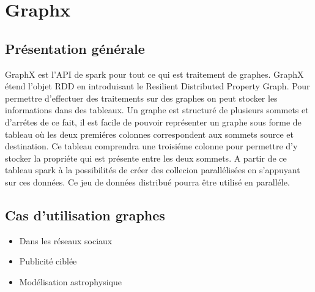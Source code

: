 \section{Graphx}

\subsection{Présentation générale}

GraphX est l'API de spark pour tout ce qui est traitement de graphes. GraphX étend l'objet RDD en introduisant le Resilient Distributed Property Graph. Pour permettre d'effectuer des traitements sur des graphes on peut stocker les informations dans des tableaux. Un graphe est structuré de plusieurs sommets et d'arrétes de ce fait, il est facile de pouvoir représenter un graphe sous forme de tableau où les deux premiéres colonnes correspondent aux sommets source et destination. Ce tableau comprendra une troisiéme colonne pour permettre d'y stocker la propriéte qui est présente entre les deux sommets. A partir de ce tableau spark à la possibilités de créer des collecion parallélisées en s'appuyant sur ces données. Ce jeu de données distribué pourra être utilisé en paralléle.

\subsection{Cas d'utilisation graphes}

\begin{itemize}
      \item Dans les réseaux sociaux
      \item Publicité ciblée
      \item Modélisation astrophysique
\end{itemize}